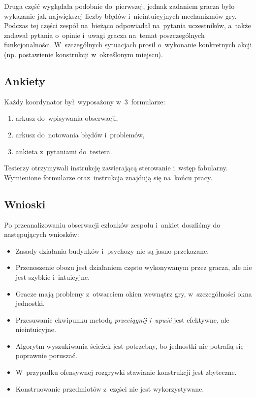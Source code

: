 \documentclass[licencjacka]{pracamgr}
\begin{document}
      Druga część wyglądała podobnie do~pierwszej, jednak zadaniem gracza było wykazanie jak największej liczby błędów
      i~nieintuicyjnych mechanizmów gry. Podczas tej części zespół na~bieżąco odpowiadał na~pytania uczestników,
      a~także zadawał pytania o~opinie i~uwagi gracza na~temat poszczególnych funkcjonalności.
      W~szczególnych sytuacjach prosił o~wykonanie konkretnych akcji (np. postawienie konstrukcji w~określonym miejscu).

    \subsection{Ankiety}
      Każdy koordynator był~wyposażony w~3~formularze:
      \begin{enumerate}
        \item arkusz do~wpisywania obserwacji,
        \item arkusz do~notowania błędów i~problemów,
        \item ankieta z~pytaniami do~testera.
      \end{enumerate}
        Testerzy otrzymywali instrukcję zawierającą sterowanie i~wstęp fabularny. Wymienione formularze oraz~instrukcja
        znajdują się na~końcu pracy.

    \subsection{Wnioski}
      Po przeanalizowaniu obserwacji członków zespołu i~ankiet doszliśmy do następujących wniosków:
      \begin{itemize}
        \item Zasady działania budynków i~psychozy nie są jasno przekazane.
        \item Przenoszenie obozu jest działaniem często wykonywanym przez gracza, ale nie jest szybkie i~intuicyjne.
        \item Gracze mają problemy z~otwarciem okien wewnątrz gry, w~szczególności okna jednostki.
        \item Przesuwanie ekwipunku metodą \emph{przeciągnij i~upuść} jest efektywne, ale nieintuicyjne.
        \item Algorytm wyszukiwania ścieżek jest potrzebny, bo jednostki nie potrafią się poprawnie poruszać.
        \item W~przypadku ofensywnej rozgrywki stawianie konstrukcji jest zbyteczne.
        \item Konstruowanie przedmiotów z~części nie jest wykorzystywane.
      \end{itemize}
\end{document}
